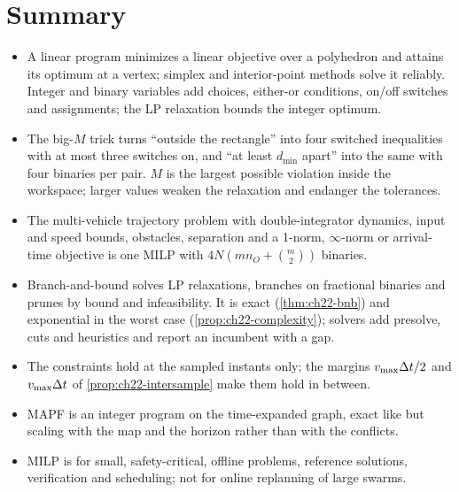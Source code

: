 \section{Summary}
\begin{summary}
\begin{itemize}
  \item A linear program minimizes a linear objective over a polyhedron
        and attains its optimum at a vertex; simplex and interior-point
        methods solve it reliably. Integer and binary variables add
        choices, either-or conditions, on/off switches and assignments;
        the LP relaxation bounds the integer optimum.
  \item The big-$M$ trick turns ``outside the rectangle'' into four
        switched inequalities with at most three switches on, and
        ``at least $d_{\min}$ apart'' into the same with four binaries per
        pair. $M$ is the largest possible violation inside the workspace;
        larger values weaken the relaxation and endanger the tolerances.
  \item The multi-vehicle trajectory problem with double-integrator
        dynamics, input and speed bounds, obstacles, separation and a
        1-norm, $\infty$-norm or arrival-time objective is one MILP with
        $4N(m n_O + \binom{m}{2})$ binaries.
  \item Branch-and-bound solves LP relaxations, branches on fractional
        binaries and prunes by bound and infeasibility. It is exact
        (\cref{thm:ch22-bnb}) and exponential in the worst case
        (\cref{prop:ch22-complexity}); solvers add presolve, cuts and
        heuristics and report an incumbent with a gap.
  \item The constraints hold at the sampled instants only; the margins
        $v_{\max}\Delta t/2$ and $v_{\max}\Delta t$ of \cref{prop:ch22-intersample}
        make them hold in between.
  \item MAPF is an integer program on the time-expanded graph, exact like
        \cbs but scaling with the map and the horizon rather than with the
        conflicts.
  \item MILP is for small, safety-critical, offline problems, reference
        solutions, verification and scheduling; not for online replanning
        of large swarms.
\end{itemize}
\end{summary}

